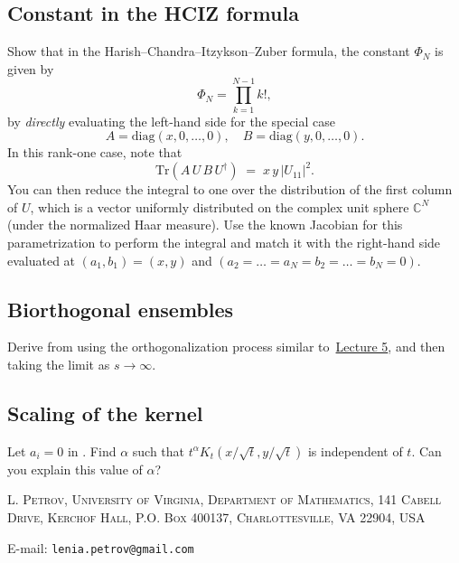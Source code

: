 \documentclass[letterpaper,11pt,oneside,reqno]{article}
\numberwithin{equation}{section}
\theoremstyle{definition}
\begin{document}
\subsection{Constant in the HCIZ formula}
\label{prob:PhiN}

Show that in the Harish--Chandra--Itzykson--Zuber formula, the constant $\Phi_N$ is given by
\[
   \Phi_N = \prod_{k=1}^{N-1} k!,
\]
by \emph{directly} evaluating the left-hand side for the special case
\[
   A=\mathrm{diag}(x,0,\dots,0),
   \quad
   B=\mathrm{diag}(y,0,\dots,0).
\]
In this rank-one case, note that
\[
   \mathrm{Tr}(A\,U\,B\,U^\dagger)
   \;=\;
   x\,y \,\bigl|U_{11}\bigr|^2.
\]
You can then reduce the integral to one over the distribution of the first column of $U$,
which is a vector uniformly distributed on the complex unit sphere $\mathbb{C}^N$ (under the normalized Haar measure).
Use the known Jacobian for this parametrization to perform the integral and match it with
the right-hand side evaluated at $(a_1,b_1)=(x,y)$ and $(a_2=\dots=a_N=b_2=\dots=b_N=0)$.


\subsection{Biorthogonal ensembles}
\label{prob:biorthogonal}

Derive  from
using the orthogonalization process similar
to~\href{https://lpetrov.cc/rmt25/rmt25-notes/rmt2025-l05.pdf}{Lecture 5},
and then taking the limit as $s\to\infty$.

\subsection{Scaling of the kernel}
\label{prob:scaling}

Let $a_i=0$ in .
Find $\alpha$ such that
$t^\alpha K_t(x/\sqrt{t},y/\sqrt{t})$ is independent of $t$.
Can you explain this value of $\alpha$?












































\medskip

\textsc{L. Petrov, University of Virginia, Department of Mathematics, 141 Cabell Drive, Kerchof Hall, P.O. Box 400137, Charlottesville, VA 22904, USA}

E-mail: \texttt{lenia.petrov@gmail.com}
\end{document}
